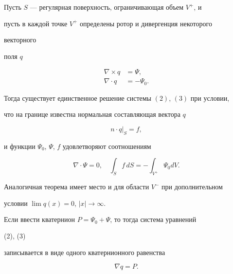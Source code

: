 \begin{thm} 


Пусть $S$ --- регулярная поверхность, ограничивающая объем $V^+$, и 


пусть в каждой точке $V^+$ определены ротор и дивергенция некоторого 


векторного  


поля $q$ 


\begin{align} 


\nabla\times q&=\Psi, \\ 


\nabla\cdot q&=-\Psi_0. 


\end{align} 


Тогда существует единственное решение системы $(2)$, $(3)$ при условии, 


что на границе известна нормальная составляющая вектора $q$ 


\begin{equation} 


n\cdot q|_S=f,


\end{equation} 


и функции $\Psi_0$, $\Psi$, $f$ удовлетворяют соотношениям 


\begin{equation} 


\nabla\cdot\Psi=0,\quad \int_S f\,dS=-\int_{V^+}\Psi_0dV. 


\end{equation} 


\end{thm} 


 


Аналогичная теорема имеет место и для области $V^-$ при дополнительном  


условии $\lim q(x)=0$, $|x|\to\infty$. 


 


Если ввести кватернион $P=\Psi_0+\Psi$, то тогда система уравнений 


(2), (3)  


записывается в виде одного кватернионного равенства 


\begin{equation} 


\nabla q=P. 


\end{equation} 



